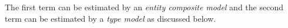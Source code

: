\documentclass[11pt,a4paper]{article}
\begin{document}
The first term can be estimated by an {\it entity composite model}  and the second term can be estimated by a {\it type model} as discussed below.

\begin{comment}
\begin{equation}
\label{eq:decomposed}
\begin{split}
&p\left(w, s(w) | \Bar{w}, \Bar{w}, \theta \right) \\
& = \begin{cases}
\textbf{if $s(w) \in S$: } \\
( p\left(s(w) \in S |\Bar{w}, \Bar{w}', \theta_t \right) \textbf{.} \\p\left(w|\Bar{w}, \Bar{w}', s(w) \in S, \theta_v \right) )\\  
\textbf{else:}\\
  (p\left(s(w) \not \in S|\Bar{w}, \Bar{w}', \theta_t \right) \textbf{.}\\
 p\left(w|\Bar{w}, \Bar{w}', s(w) \not \in S, \theta_v \right))
  \end{cases}\\
  &= \begin{cases}
\textbf{if $s(w) = s \in S$: } \\
(p\left(s(w) = s| \Bar{w}, \Bar{w}', \theta_t \right) \textbf{.}\\ p(w|\Bar{w}, \Bar{w}', s(w) = s, \theta_v ))\\
\textbf{else:} \\
  ((1- \sum_{s_i \in S}p(s(w) = \\ s_i | \Bar{w}', \theta_t)) \textbf{.}  p(w|\\\Bar{w}, \Bar{w}', s(w) \not \in S, \theta_v ))
  \end{cases} 
\end{split}
\end{equation}

where $(\theta_t, \theta_v) \in \theta$. We assume that the type context $\Bar{w}'$ is sufficient enough to learn to predict the type $s(w)$ of the next token $w$ regardless the actual word context $\Bar{w}$. In other words, model parameter $\theta_t$ which predicts $s(w)$ can be trained properly without $\Bar{w}$,

\begin{equation}\label{eq:approx_assumption}
    p(s(w)|\Bar{w},\Bar{w}', \theta_t, \theta_v) \approx p(s(w)|\Bar{w}', \theta_t)
\end{equation}


Similarly, for  $p(w|\Bar{w}, \Bar{w}', s(w), \theta_v )$, we do not need to provide the type s(w) explicitly as per the assumption in Equation \ref{eq:approx_assumption}, the given type context $\Bar{w}'$ is implicitly sufficient enough to provide the model the type $s(w)$ of the next word, in other words 


\end{comment}
\end{document}
